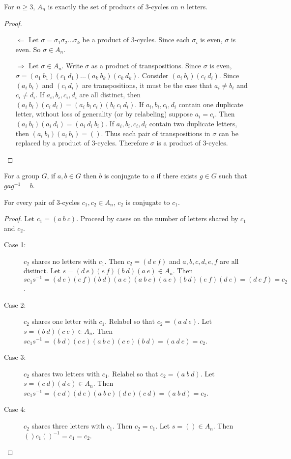 \documentclass[a4paper]{article}
\begin{document}
\begin{theorem}
\label{generatethm}
For $n \ge 3$, $A_n$ is exactly the set of products of 3-cycles on $n$ letters.
\end{theorem}
\begin{proof}~
\begin{enumerate}
\item[$\Leftarrow$]
Let $\sigma = \sigma_1 \sigma_2 ... \sigma_k$ be a product of 3-cycles. Since each $\sigma_i$ is even, $\sigma$ is even. So $\sigma \in A_n$.
\item[$\Rightarrow$]
Let $\sigma \in A_n$. Write $\sigma$ as a product of transpositions. Since $\sigma$ is even, $\sigma=(a_1\ b_1)(c_1\ d_1)...(a_k\ b_k)(c_k\ d_k)$. Consider $(a_i\ b_i)(c_i\ d_i)$. Since $(a_i\ b_i)$ and $(c_i\ d_i)$ are transpositions, it must be the case that $a_i \ne b_i$ and $c_i \ne d_i$. If $a_i, b_i, c_i, d_i$ are all distinct, then $(a_i\ b_i)(c_i\ d_i) = (a_i\ b_i\ c_i)(b_i\ c_i\ d_i)$. If $a_i, b_i, c_i, d_i$ contain one duplicate letter, without loss of generality (or by relabeling) suppose $a_i = c_i$. Then $(a_i\ b_i)(a_i\ d_i) = (a_i\ d_i\ b_i)$. If $a_i, b_i, c_i, d_i$ contain two duplicate letters, then $(a_i\ b_i)(a_i\ b_i) = ()$. Thus each pair of transpositions in $\sigma$ can be replaced by a product of 3-cycles. Therefore $\sigma$ is a product of 3-cycles.
\end{enumerate}
\end{proof}

\begin{definition}
For a group $G$, if $a, b \in G$ then $b$ is conjugate to $a$ if there exists $g \in G$ such that $g a g^{-1} = b$.
\end{definition}

\begin{theorem}
\label{conjugatetheorem}
For every pair of 3-cycles $c_1, c_2 \in A_n$, $c_2$ is conjugate to $c_1$.
\end{theorem}
\begin{proof}
Let $c_1 = (a\ b\ c)$. Proceed by cases on the number of letters shared by $c_1$ and $c_2$.
\begin{description}
   \item[Case 1:]$c_2$ shares no letters with $c_1$.
   Then $c_2 = (d\ e\ f)$ and $a, b, c, d, e, f$ are all distinct. Let $s = (d\ e)(e\ f)(b\ d)(a\ e) \in A_n$. Then $s c_1 s^{-1} = (d\ e)(e\ f)(b\ d)(a\ e)(a\ b\ c)(a\ e)(b\ d)(e\ f)(d\ e) = (d\ e\ f) = c_2$.
   \item[Case 2:]$c_2$ shares one letter with $c_1$.
   Relabel so that $c_2 = (a\ d\ e)$. Let $s = (b\ d)(c\ e) \in A_n$. Then $s c_1 s^{-1} = (b\ d)(c\ e)(a\ b\ c)(c\ e)(b\ d) = (a\ d\ e) = c_2$.
   \item[Case 3:]$c_2$ shares two letters with $c_1$.
   Relabel so that $c_2 = (a\ b\ d)$. Let $s = (c\ d)(d\ e) \in A_n$. Then $s c_1 s^{-1} = (c\ d)(d\ e)(a\ b\ c)(d\ e)(c\ d) = (a\ b\ d) = c_2$.
   \item[Case 4:]$c_2$ shares three letters with $c_1$.
   Then $c_2 = c_1$. Let $s = () \in A_n$. Then $() c_1 ()^{-1} = c_1 = c_2$.
\end{description}
\end{proof}
\end{document}
